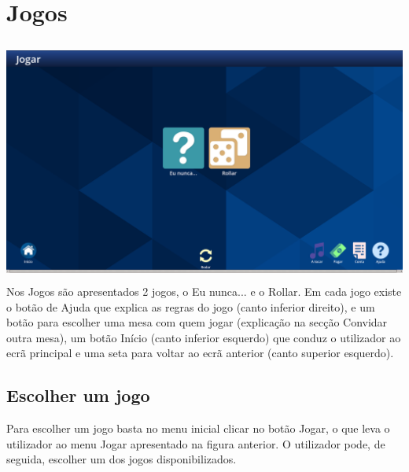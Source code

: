 \documentclass{article}
\begin{document}
\section{Jogos}
\includegraphics[width=15cm, height=8cm]{user_manual_images/games_menu.png}
Nos Jogos são apresentados 2 jogos, o Eu nunca... e o Rollar.
Em cada jogo existe o botão de Ajuda que explica as regras do jogo (canto inferior direito), e um botão para escolher uma mesa com quem jogar (explicação na secção Convidar outra mesa), um botão Início (canto inferior esquerdo) que conduz o utilizador ao ecrã principal e uma seta para voltar ao ecrã anterior (canto superior esquerdo).
\subsection{Escolher um jogo}
Para escolher um jogo basta no menu inicial clicar no botão Jogar, o que leva o utilizador ao menu Jogar apresentado na figura anterior.
O utilizador pode, de seguida, escolher um dos jogos disponibilizados.
\end{document}
